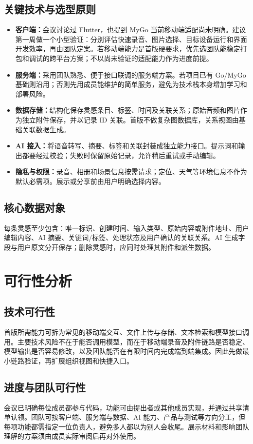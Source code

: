 \documentclass[UTF8,a4paper,12pt]{ctexart}
\begin{document}
\subsection{关键技术与选型原则}
\begin{itemize}
  \item \textbf{客户端：}会议讨论过 Flutter，也提到 MyGo 当前移动端适配尚未明确。建议第一周做一个小型验证：分别评估快速录音、图片选择、目标设备运行和界面开发效率，再由团队定案。若移动端能力是首版硬要求，优先选团队能稳定打包和调试的跨平台方案；不以尚未验证的适配能力作为进度前提。
  \item \textbf{服务端：}采用团队熟悉、便于接口联调的服务端方案。若项目已有 Go/MyGo 基础则沿用；否则先用成员能维护的简单服务，避免为技术栈本身增加学习和部署风险。
  \item \textbf{数据存储：}结构化保存灵感条目、标签、时间及关联关系；原始音频和图片作为独立附件保存，并以记录 ID 关联。首版不做复杂图数据库，关系视图由基础关联数据生成。
  \item \textbf{AI 接入：}将语音转写、摘要、标签和关联封装成独立能力接口。提示词和输出都要经过校验；失败时保留原始记录，允许稍后重试或手动编辑。
  \item \textbf{隐私与权限：}录音、相册和场景信息按需请求；定位、天气等环境信息不作为默认必需项。展示或分享前由用户明确选择内容。
\end{itemize}

\subsection{核心数据对象}
每条灵感至少包含：唯一标识、创建时间、输入类型、原始内容或附件地址、用户编辑内容、AI 摘要、关键词/标签、处理状态及用户确认的关联关系。AI 生成字段与用户原文分开保存；删除灵感时，应同时处理其附件和派生数据。

\section{可行性分析}

\subsection{技术可行性}
首版所需能力可拆为常见的移动端交互、文件上传与存储、文本检索和模型接口调用。主要技术风险不在于能否调用模型，而在于移动端录音及附件链路是否稳定、模型输出是否容易修改，以及团队能否在有限时间内完成端到端集成。因此先做最小链路验证，再扩展组织视图和快捷入口。

\subsection{进度与团队可行性}
会议已明确每位成员都参与代码，功能可由提出者或其他成员实现，并通过共享清单认领。团队可按客户端、服务端与数据、AI 能力、产品与测试等方向分工，但每项功能都需指定一位负责人，避免多人都以为别人会收尾。展示材料和影响团队理解的方案须由成员实际审阅后再对外使用。
\end{document}
